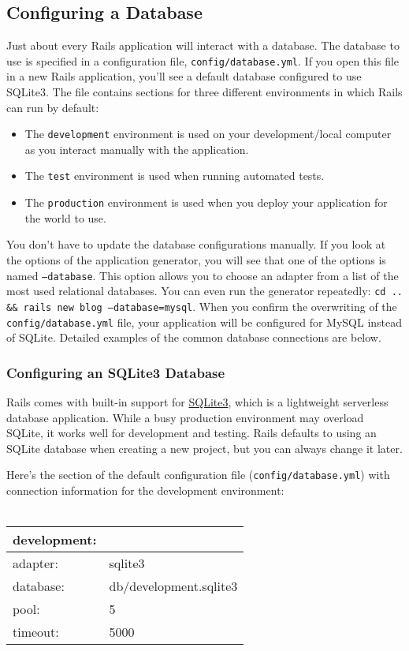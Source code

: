 \documentclass[10pt]{book}
\begin{document}
\subsection{ Configuring a Database}

Just about every Rails application will interact with a database. The database to use is specified in a configuration file, \texttt{config/database.yml}.  If you open this file in a new Rails application, you’ll see a default database configured to use SQLite3. The file contains sections for three different environments in which Rails can run by default:
\begin{itemize}
	\item The \texttt{development} environment is used on your development/local computer as you interact manually with the application.
	\item The \texttt{test} environment is used when running automated tests.
	\item The \texttt{production} environment is used when you deploy your application for the world to use.
\end{itemize}

You don’t have to update the database configurations manually. If you look at the options of the application generator, you will see that one of the options is named \texttt{—database}. This option allows you to choose an adapter from a list of the most used relational databases. You can even run the generator repeatedly: \texttt{cd .. \&\& rails new blog —database=mysql}. When you confirm the overwriting  of the \texttt{config/database.yml} file, your application will be configured for MySQL instead of SQLite.  Detailed examples of the common database connections are below.

\subsubsection{ Configuring an SQLite3 Database}

Rails comes with built-in support for \href{http://www.sqlite.org/}{SQLite3}, which is a lightweight serverless database application. While a busy production environment may overload SQLite, it works well for development and testing. Rails defaults to using an SQLite database when creating a new project, but you can always change it later.

Here’s the section of the default configuration file (\texttt{config/database.yml}) with connection information for the development environment:
\\ \\
\begin{tabular}{ll}
development:\\
\hline
adapter: & sqlite3\\
database: & db/development.sqlite3\\
pool: & 5\\
timeout: & 5000\\
\end{tabular}
\\ \\
\end{document}
